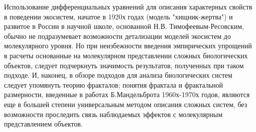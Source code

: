 Использование дифференциальных уравнений для описания характерных свойств в поведении экосистем, начатое в 1920х годах (модель "хищник-жертва") и развитое в России в научной школе, основанной Н.В. Тимофеевым-Ресовским, обычно не подразумевает возможности детализации моделей экосистем до молекулярного уровня. Но при неизбежности введения эмпирических упрощений в расчеты основанные на молекулярном представлении сложных биологических объектов, следует подчеркнуть значимость результатов, полученных при таком подходе. И, наконец, в обзоре подходов для анализа биологических систем следует упомянуть теорию фракталов; понятия фрактала и фрактальной размерности, введенные в работах Б.Мандельброта 1960х-1970х годов, являются еще в большей степени универсальным методом описания сложных систем, без возможности проследить связь наблюдаемых эффектов с молекулярным представлением объектов.







